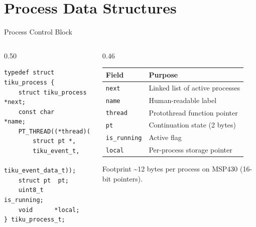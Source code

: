 \documentclass[aspectratio=169, 10pt]{beamer}
\begin{document}
\section{Process Data Structures}

\begin{frame}[fragile]{Process Control Block}
\begin{columns}[T]
\begin{column}{0.50\textwidth}
\begin{lstlisting}[style=cstyle,
  title={kernel/process/tiku\_process.h}]
typedef struct tiku_process {
    struct tiku_process *next;
    const char          *name;
    PT_THREAD((*thread)(
        struct pt *,
        tiku_event_t,
        tiku_event_data_t));
    struct pt  pt;
    uint8_t    is_running;
    void      *local;
} tiku_process_t;
\end{lstlisting}
\end{column}

\begin{column}{0.46\textwidth}
\begin{tabular}{@{}lp{4.2cm}@{}}
\toprule
\textbf{Field} & \textbf{Purpose} \\
\midrule
\texttt{next}       & Linked list of active processes \\
\texttt{name}       & Human-readable label \\
\texttt{thread}     & Protothread function pointer \\
\texttt{pt}         & Continuation state (2 bytes) \\
\texttt{is\_running} & Active flag \\
\texttt{local}      & Per-process storage pointer \\
\bottomrule
\end{tabular}

\vspace{0.5em}
\begin{block}{Footprint}
\textasciitilde12 bytes per process on MSP430 (16-bit pointers).
\end{block}
\end{column}
\end{columns}
\end{frame}
\end{document}
